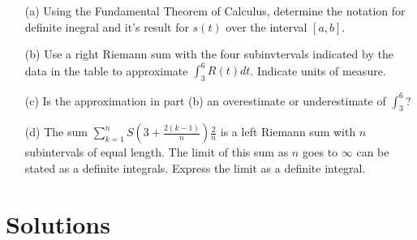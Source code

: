 \documentclass{article}
\newcommand{\qspace}{\vspace*{1.7em}}
\begin{document}
    \begin{enumerate}
        
        \item[(a)] Using the Fundamental Theorem of Calculus, determine the notation for definite inegral and it's result 
                   for $s(t)$ over the interval $[a, b]$. \qspace 
        \item[(b)] Use a right Riemann sum with the four subinvtervals indicated by the data in the table to 
                   approximate $\int_3^6 R(t)dt$. Indicate units of measure. \qspace
        \item[(c)] Is the approximation in part (b) an overestimate or underestimate of $\int_3^6$? \qspace
        \item[(d)] The sum $\sum_{k = 1}^n S\left(3 + \frac{2(k - 1)}{n}\right)\frac{2}{n}$ is a left Riemann sum with $n$ subintervals of equal length. 
                   The limit of this sum as $n$ goes to $\infty$ can be stated as a definite integrals. Express the limit as a definite integral.

    \end{enumerate}
    \newpage



    \section*{Solutions}
\end{document}
